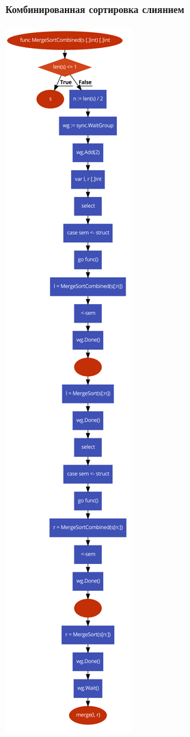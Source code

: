 \documentclass[utf8x, 12pt]{G7-32} %
\begin{document}
\newpage

\paragraph{Комбинированная сортировка слиянием}
\begin{center}
	\includegraphics[scale=0.32]{images/mergeSortCombined.png}
\end{center}
\end{document}
